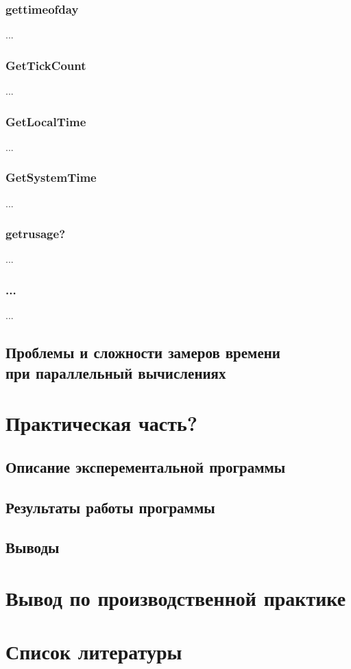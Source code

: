 \documentclass{article}
\begin{document}
			\subsubsection*{gettimeofday} ...
			\subsubsection*{GetTickCount} ... 
			\subsubsection*{GetLocalTime} ...
			\subsubsection*{GetSystemTime} ...
			\subsubsection*{getrusage?} ...
			\subsubsection*{...} ...					
		\newpage
		\subsection{Проблемы и сложности замеров времени \\ при параллельный вычислениях}
	\newpage
	\section{Практическая часть?}
		\subsection{Описание эксперементальной программы}
		\subsection{Результаты работы программы}
		\subsection{Выводы}
	\newpage
	\section{Вывод по производственной практике}
	\newpage
	\section{Список литературы}
\end{document}
